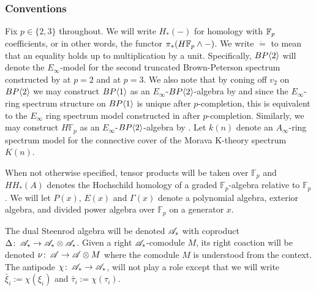 \subsubsection*{Conventions}
Fix $p\in\{2,3\}$ throughout. We will write $H_*(-)$ for homology with $\mathbb{F}_p$ coefficients, or in other words, the functor $\pi_*(H\mathbb{F}_p\wedge -)$. We write $\dot{=}$ to mean that an equality holds up to multiplication by a unit. Specifically, $BP\langle 2 \rangle$ will denote the $E_{\infty}$-model for the second truncated Brown-Peterson spectrum constructed by \cite{LawsonNaumann} at $p=2$ and \cite{HillLawson} at $p=3$. 
We also note that by coning off $v_2$ on $BP\langle 2 \rangle$ we may construct $BP\langle 1 \rangle$ as an $E_{\infty}$-$BP\langle 2 \rangle$-algebra by \cite{BSS20} and since the $E_{\infty}$-ring spectrum structure on $BP\langle 1 \rangle$ is unique after $p$-completion, this is equivalent to the $E_{\infty}$ ring spectrum model constructed in \cite{McClureStaffeldt} after $p$-completion. Similarly, we may construct $H\mathbb{F}_p$ as an $E_{\infty}$-$BP\langle 2 \rangle$-algebra by \cite{BSS20}. Let $k(n)$ denote an $A_{\infty}$-ring spectrum model for the connective cover of the Morava K-theory spectrum $K(n)$. 

When not otherwise specified, tensor products will be taken over $\mathbb{F}_p$ and $HH_*(A)$ denotes the Hochschild homology of a graded $\mathbb{F}_p$-algebra relative to $\mathbb{F}_p$. We will let $P(x)$, $E(x)$ and $\Gamma(x)$ denote a polynomial algebra, exterior algebra, and divided power algebra over $\mathbb{F}_p$ on a generator $x$. 

The dual Steenrod algebra will be denoted $\mathscr{A}_*$ with coproduct $\Delta\colon \thinspace \mathscr{A}_*\to \mathscr{A}_*\otimes \mathscr{A}_*$. Given a right $\mathscr{A}_*$-comodule $M$, its right coaction will be denoted $\nu\colon \thinspace \mathscr{A}\to \mathscr{A}\otimes M$ where the comodule $M$ is understood from the context. The antipode $\chi\colon \thinspace \mathscr{A}_*\to\mathscr{A}_*$, will not play a role except that we will write $\bar{\xi}_i:=\chi(\xi_i)$ and $\bar{\tau}_i:=\chi(\tau_i)$. 